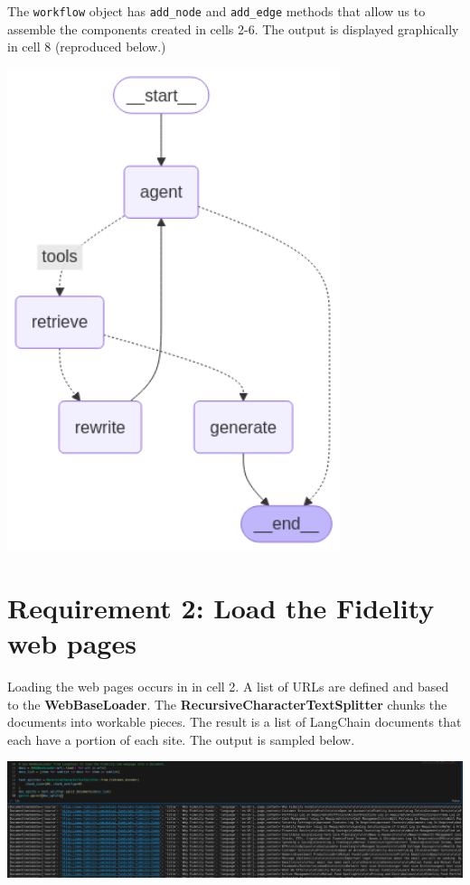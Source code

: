 \documentclass[11pt,letterpaper]{article}
\begin{document}
The \texttt{workflow} object has \texttt{add\_node} and \texttt{add\_edge} methods that allow us to assemble the 
components created in cells 2-6. The output is displayed graphically in cell 8 (reproduced below.)
\begin{center}
    \includegraphics[height=400pt]{Assignment_01_Geidel_7_0.png}
\end{center}

\clearpage

\section*{Requirement 2: Load the Fidelity web pages}
\tab Loading the web pages occurs in in cell 2. A list of URLs are defined and based to the \textbf{WebBaseLoader}.
The \textbf{RecursiveCharacterTextSplitter} chunks the documents into workable pieces. The result is a list of LangChain documents that each have
a portion of each site. The output is sampled below.

\begin{center}
    \includegraphics{req_2.png}
\end{center}
\end{document}
